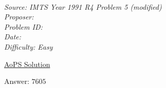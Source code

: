 \SSbreak\\
\emph{Source: IMTS Year 1991 R4 Problem 5 (modified)} \\
\emph{Proposer: \Pflame}\\ %
\emph{Problem ID:}\\
\emph{Date: }\\
\emph{Difficulty: Easy}\\
\SSbreak

\bigskip

\begin{solution}\hfil\medskip
	
	\href{https://artofproblemsolving.com/community/q2h54423p339658}{AoPS Solution} \medskip
	
	Answer: \(\boxed{7605}\)
\end{solution}\bigskip
